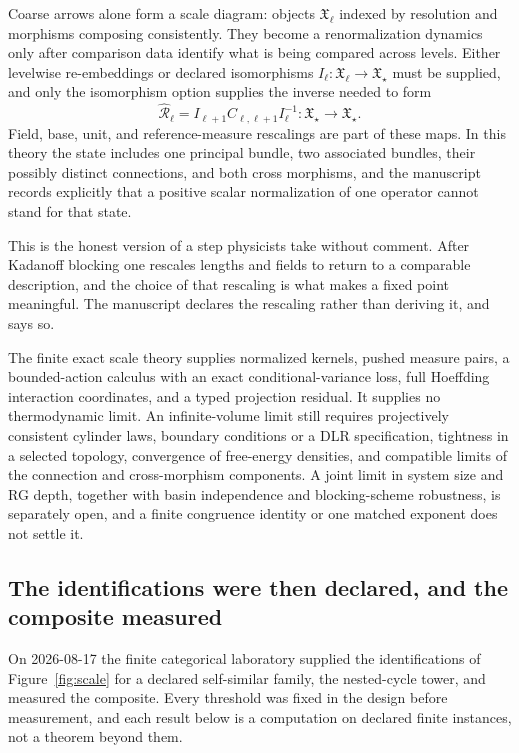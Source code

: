 \documentclass[11pt,letterpaper]{article}
\begin{document}
Coarse arrows alone form a scale diagram: objects \(\mathfrak X_\ell\) indexed by resolution and morphisms composing consistently. They become a renormalization dynamics only after comparison data identify what is being compared across levels. Either levelwise re-embeddings or declared isomorphisms \(I_\ell:\mathfrak X_\ell\to\mathfrak X_\star\) must be supplied, and only the isomorphism option supplies the inverse needed to form
\begin{equation}
  \widehat{\mathcal R}_\ell=I_{\ell+1}C_{\ell,\ell+1}I_\ell^{-1}:\mathfrak X_\star\to\mathfrak X_\star.
  \label{eq:rg-map}
\end{equation}
Field, base, unit, and reference-measure rescalings are part of these maps. In this theory the state includes one principal bundle, two associated bundles, their possibly distinct connections, and both cross morphisms, and the manuscript records explicitly that a positive scalar normalization of one operator cannot stand for that state.

This is the honest version of a step physicists take without comment. After Kadanoff blocking one rescales lengths and fields to return to a comparable description, and the choice of that rescaling is what makes a fixed point meaningful. The manuscript declares the rescaling rather than deriving it, and says so.

\begin{boundarybox}
The finite exact scale theory supplies normalized kernels, pushed measure pairs, a bounded-action calculus with an exact conditional-variance loss, full Hoeffding interaction coordinates, and a typed projection residual. It supplies no thermodynamic limit. An infinite-volume limit still requires projectively consistent cylinder laws, boundary conditions or a DLR specification, tightness in a selected topology, convergence of free-energy densities, and compatible limits of the connection and cross-morphism components. A joint limit in system size and RG depth, together with basin independence and blocking-scheme robustness, is separately open, and a finite congruence identity or one matched exponent does not settle it.
\end{boundarybox}

\subsection{The identifications were then declared, and the composite measured}

On 2026-08-17 the finite categorical laboratory supplied the identifications of Figure~\ref{fig:scale} for a declared self-similar family, the nested-cycle tower, and measured the composite. Every threshold was fixed in the design before measurement, and each result below is a computation on declared finite instances, not a theorem beyond them.
\end{document}
